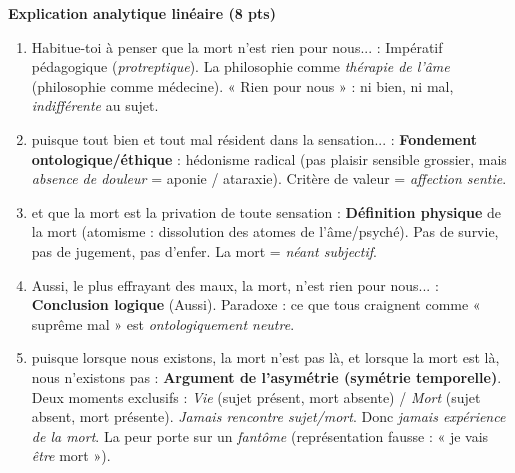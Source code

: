\documentclass[11pt]{article}
\newcommand{\cle}[1]{{\popxbold\color{popdark}#1}}
\begin{document}
\begin{corrige}
\textbf{Explication analytique linéaire (8 pts)}\par
\begin{enumerate}
\item \guillemotleft Habitue-toi à penser que la mort n'est rien pour nous... \guillemotright : Impératif pédagogique (\emph{protreptique}). La philosophie comme \emph{thérapie de l'âme} (philosophie comme médecine). « Rien pour nous » : ni bien, ni mal, \emph{indifférente} au sujet.
\item \guillemotleft puisque tout bien et tout mal résident dans la sensation... \guillemotright : \textbf{Fondement ontologique/éthique} : \cle{hédonisme} radical (pas plaisir sensible grossier, mais \emph{absence de douleur} = aponie / ataraxie). Critère de valeur = \emph{affection sentie}.
\item \guillemotleft et que la mort est la privation de toute sensation \guillemotright : \textbf{Définition physique} de la mort (atomisme : dissolution des atomes de l'âme/psyché). Pas de survie, pas de jugement, pas d'enfer. La mort = \emph{néant subjectif}.
\item \guillemotleft Aussi, le plus effrayant des maux, la mort, n'est rien pour nous... \guillemotright : \textbf{Conclusion logique} (Aussi). Paradoxe : ce que tous craignent comme « suprême mal » est \emph{ontologiquement neutre}.
\item \guillemotleft puisque lorsque nous existons, la mort n'est pas là, et lorsque la mort est là, nous n'existons pas \guillemotright : \textbf{Argument de l'asymétrie (symétrie temporelle)}. Deux moments exclusifs : \emph{Vie} (sujet présent, mort absente) / \emph{Mort} (sujet absent, mort présente). \emph{Jamais rencontre sujet/mort}. Donc \emph{jamais expérience de la mort}. La peur porte sur un \emph{fantôme} (représentation fausse : « je vais \emph{être} mort »).
\end{enumerate}


\end{corrige}
\end{document}
